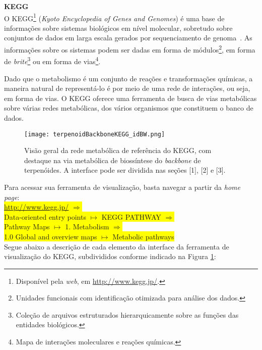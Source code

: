 \textbf{KEGG} \\

\indent O KEGG\footnote{Disponível pela \textit{web}, em \url{http://www.kegg.jp/}.} (\textit{Kyoto Encyclopedia of Genes and Genomes}) é uma base de informações sobre sistemas biológicos em nível molecular, sobretudo sobre conjuntos de dados em larga escala gerados por sequenciamento de genoma~\cite{keggOverview}. As informações sobre os sistemas podem ser dadas em forma de módulos\footnote{Unidades funcionais com identificação otimizada para análise dos dados.}, em forma de \textit{brite}\footnote{Coleção de arquivos estruturados hierarquicamente sobre as funções das entidades biológicos.} ou em forma de vias\footnote{Mapa de interações moleculares e reações químicas.}.

\indent Dado que o metabolismo é um conjunto de reações e transformações químicas, a maneira natural de representá-lo é por meio de uma rede de interações, ou seja, em forma de vias. O KEGG oferece uma ferramenta de busca de vias metabólicas sobre várias redes metabólicas, dos vários organismos que constituem o banco de dados.

\begin{figure}[!h]
\centering
\texttt{[image: terpenoidBackboneKEGG\_idBW.png]}
\caption{Visão geral da rede metabólica de referência do KEGG, com destaque na via metabólica de biossíntese do \textit{backbone} de terpenóides. A interface pode ser dividida nas seções [1], [2] e [3].}
\label{terpenoidBackboneKEGG_id}
\end{figure}

\indent Para acessar sua ferramenta de visualização, basta navegar a partir da \textit{home page}: \\

\indent \colorbox{yellow}{\url{http://www.kegg.jp/} $\Rightarrow$} \\
\indent \colorbox{yellow}{Data-oriented entry points  $\mapsto$ KEGG PATHWAY $\Rightarrow$} \\
\indent \colorbox{yellow}{Pathway Maps $\mapsto$ 1. Metabolism  $\Rightarrow$} \\
\indent \colorbox{yellow}{1.0 Global and overview maps $\mapsto$ Metabolic pathways} \\

\indent Segue abaixo a descrição de cada elemento da interface da ferramenta de visualização do KEGG, subdivididos conforme indicado na Figura \ref{terpenoidBackboneKEGG_id}:

